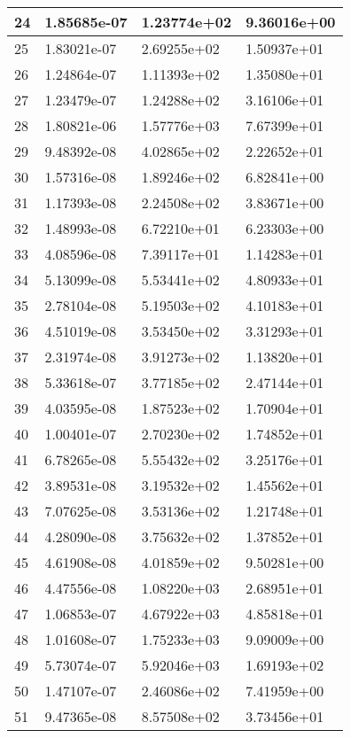 \documentclass{article}
\begin{document}
\begin{table}[H]
{\begin{tabular}{|l|l|l|l|}
24 & 1.85685e-07 & 1.23774e+02 & 9.36016e+00 \\ \hline
25 & 1.83021e-07 & 2.69255e+02 & 1.50937e+01 \\ \hline
26 & 1.24864e-07 & 1.11393e+02 & 1.35080e+01 \\ \hline
27 & 1.23479e-07 & 1.24288e+02 & 3.16106e+01 \\ \hline
28 & 1.80821e-06 & 1.57776e+03 & 7.67399e+01 \\ \hline
29 & 9.48392e-08 & 4.02865e+02 & 2.22652e+01 \\ \hline
30 & 1.57316e-08 & 1.89246e+02 & 6.82841e+00 \\ \hline
31 & 1.17393e-08 & 2.24508e+02 & 3.83671e+00 \\ \hline
32 & 1.48993e-08 & 6.72210e+01 & 6.23303e+00 \\ \hline
33 & 4.08596e-08 & 7.39117e+01 & 1.14283e+01 \\ \hline
34 & 5.13099e-08 & 5.53441e+02 & 4.80933e+01 \\ \hline
35 & 2.78104e-08 & 5.19503e+02 & 4.10183e+01 \\ \hline
36 & 4.51019e-08 & 3.53450e+02 & 3.31293e+01 \\ \hline
37 & 2.31974e-08 & 3.91273e+02 & 1.13820e+01 \\ \hline
38 & 5.33618e-07 & 3.77185e+02 & 2.47144e+01 \\ \hline
39 & 4.03595e-08 & 1.87523e+02 & 1.70904e+01 \\ \hline
40 & 1.00401e-07 & 2.70230e+02 & 1.74852e+01 \\ \hline
41 & 6.78265e-08 & 5.55432e+02 & 3.25176e+01 \\ \hline
42 & 3.89531e-08 & 3.19532e+02 & 1.45562e+01 \\ \hline
43 & 7.07625e-08 & 3.53136e+02 & 1.21748e+01 \\ \hline
44 & 4.28090e-08 & 3.75632e+02 & 1.37852e+01 \\ \hline
45 & 4.61908e-08 & 4.01859e+02 & 9.50281e+00 \\ \hline
46 & 4.47556e-08 & 1.08220e+03 & 2.68951e+01 \\ \hline
47 & 1.06853e-07 & 4.67922e+03 & 4.85818e+01 \\ \hline
48 & 1.01608e-07 & 1.75233e+03 & 9.09009e+00 \\ \hline
49 & 5.73074e-07 & 5.92046e+03 & 1.69193e+02 \\ \hline
50 & 1.47107e-07 & 2.46086e+02 & 7.41959e+00 \\ \hline
51 & 9.47365e-08 & 8.57508e+02 & 3.73456e+01 \\ \hline

\end{tabular}}
\end{table}
\end{document}
